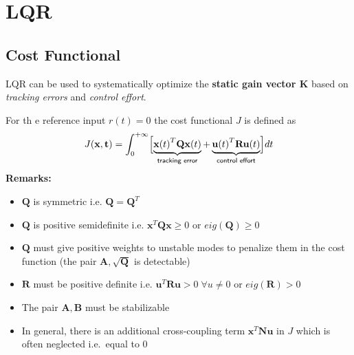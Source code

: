 \section{LQR}
\subsection{Cost Functional}
LQR can be used to systematically optimize the \textbf{static gain vector K} based on \textit{tracking errors} and \textit{control effort}.

For th   e reference input $r(t) = 0$ the cost functional $J$ is defined as
\noindent\begin{equation*}
    J(\mathbf{x,t})=\int_0^{+\infty} \Bigl[\underbrace{{\mathbf{x}(t)}^T\mathbf{Qx}(t)}_{\textsf{tracking error}} + \underbrace{{\mathbf{u}(t)}^T \mathbf{Ru}(t)}_{\textsf{control effort}} \Bigr]dt
\end{equation*}
\textbf{Remarks:}
\begin{itemize}
    \item $\mathbf{Q}$ is symmetric i.e. $\mathbf{Q}=\mathbf{Q}^T$
    \item $\mathbf{Q}$ is positive semidefinite i.e. $\mathbf{x}^T \mathbf{Qx} \geq 0$ or $eig(\mathbf{Q}) \geq 0$
    \item $\mathbf{Q}$ must give positive weights to unstable modes to penalize them in the cost function (the pair $\mathbf{A}, \sqrt{\mathbf{Q}}$ is detectable)
    \item $\mathbf{R}$ must be positive definite i.e. $\mathbf{u}^T \mathbf{Ru} >0\; \forall u\neq 0$ or $eig(\mathbf{R}) > 0$
    \item The pair $\mathbf{A,B}$ must be stabilizable
    \item In general, there is an additional cross-coupling term $\mathbf{x}^T\mathbf{Nu}$ in $J$ which is often neglected i.e.\ equal to $0$
\end{itemize}

